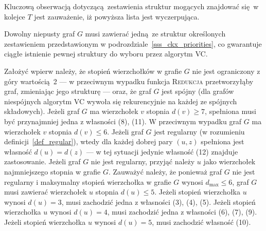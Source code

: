 {  Kluczową obserwacją dotyczącą zestawienia struktur mogących znajdować się w kolejce $T$ jest zauważenie, iż powyższa lista jest wyczerpująca.
  \begin{theorem}
    Dowolny niepusty graf $G$ musi zawierać jedną ze struktur określonych zestawieniem przedstawionym w podrozdziale~\ref{sss_ckx_priorities}, co gwarantuje ciągłe istnienie pewnej struktury do wyboru przez algorytm \textsc{VC}.
  \end{theorem}
  \begin{bproof}
    Założyć wpierw należy, że stopień wierzchołków w grafie $G$ nie jest ograniczony z góry wartością 2 --- w przeciwnym wypadku funkcja \textsc{Redukcja} przetworzyłąby graf, zmieniając jego strukturę --- oraz, że graf $G$ jest spójny (dla grafów niespójnych algorytm \textsc{VC} wywoła się rekurencyjnie na każdej ze spójnych składowych).
    Jeżeli graf $G$ ma wierzchołek $v$ stopnia $d(v) \geq 7$, spełniona musi być przynajmniej jedna z własności (8), (11).
    W przeciwnym wypadku graf $G$ ma wierzchołek $v$ stopnia $d(v) \leq 6$.
    Jeżeli graf $G$ jest regularny (w rozumieniu definicji~\ref{def_regular}), wtedy dla każdej dobrej pary $(u, z)$ spełniona jest własność $d(u)=d(z)$ --- w tej sytuacji jedynie własność (12) znajduje zastosowanie.
    Jeżeli graf $G$ nie jest regularny, przyjąć należy $u$ jako wierzchołek najmniejszego stopnia w grafie $G$.
    Zauważyć należy, że ponieważ graf $G$ nie jest regularny i maksymalny stopień wierzchołka w grafie $G$ wynosi $d_{\max} \leq 6$, graf $G$ musi zawierać wierzchołek $u$ stopnia $d(u) \leq 5$.
    Jeżeli stopień wierzchołka $u$ wynosi $d(u)=3$, musi zachodzić jedna z własności (3), (4), (5).
    Jeżeli stopień wierzchołka $u$ wynosi $d(u)=4$, musi zachodzić jedna z własności (6), (7), (9).
    Jeżeli stopień wierzchołka $u$ wynosi $d(u)=5$, musi zachodzić własność (10).
  \end{bproof}
}

